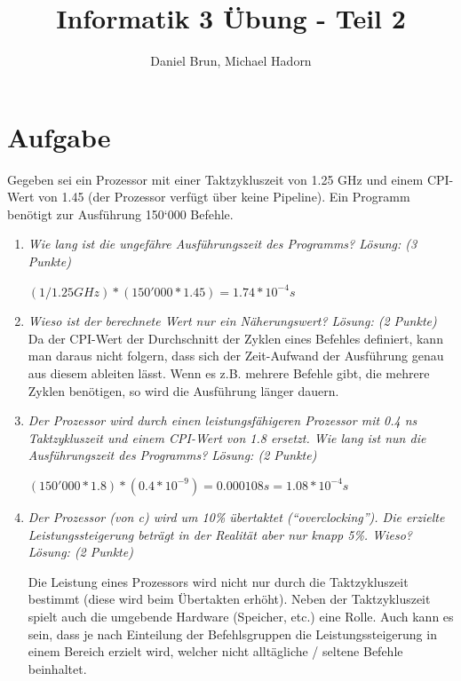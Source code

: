 \documentclass[10pt]{article}
\title{Informatik 3 Übung - Teil 2\vspace{-2ex}}
\author{Daniel Brun, Michael Hadorn\vspace{-2ex}}
\begin{document}
\maketitle

\section{Aufgabe}
Gegeben sei ein Prozessor mit einer Taktzykluszeit von 1.25 GHz und einem CPI-Wert von 1.45 (der Prozessor verfügt über keine Pipeline). Ein Programm benötigt zur Ausführung 150‘000 Befehle.

\begin{enumerate}[label=\alph*)]
	\item 
	\textit{Wie lang ist die ungefähre Ausführungszeit des	Programms? Lösung: (3 Punkte)}
	
	$ (1 / 1.25 GHz)*(150'000 * 1.45) = 1.74 * 10^{-4} s$
	
	\item
	\textit{Wieso ist der berechnete Wert nur ein Näherungswert? Lösung: (2 Punkte)}\\
	Da der CPI-Wert der Durchschnitt der Zyklen eines Befehles definiert, kann man daraus nicht folgern, dass sich der Zeit-Aufwand der Ausführung genau aus diesem ableiten lässt. Wenn es z.B. mehrere Befehle gibt, die mehrere Zyklen benötigen, so wird die Ausführung länger dauern.
	\item
	\textit{Der Prozessor wird durch einen leistungsfähigeren Prozessor mit 0.4 ns Taktzykluszeit und einem CPI-Wert von 1.8 ersetzt. Wie lang ist nun die Ausführungszeit des Programms? Lösung: (2 Punkte)}
	
	$ (150'000*1.8)*(0.4*10^{-9}) = 0.000108 s = 1.08 * 10^{-4} s$\\
			
	\item
	\textit{Der Prozessor (von c) wird um 10\% übertaktet ("`overclocking"'). Die erzielte Leistungssteigerung beträgt in der Realität aber nur knapp 5\%. Wieso? Lösung: (2 Punkte)}
	
	Die Leistung eines Prozessors wird nicht nur durch die Taktzykluszeit bestimmt (diese wird beim Übertakten erhöht). Neben der Taktzykluszeit spielt auch die umgebende Hardware (Speicher, etc.) eine Rolle. Auch kann es sein, dass je nach Einteilung der Befehlsgruppen die Leistungssteigerung in einem Bereich erzielt wird, welcher nicht alltägliche / seltene Befehle beinhaltet.
	
\end{enumerate}
\newpage
\end{document}
